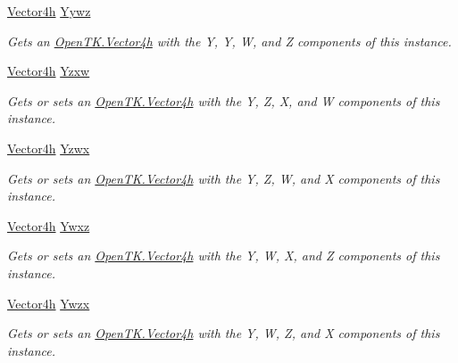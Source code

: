\begin{DoxyCompactItemize}
\hyperlink{struct_open_t_k_1_1_vector4h}{Vector4h} \hyperlink{struct_open_t_k_1_1_vector4h_a8630663753c0ac0662e433e0eca71ad8}{Yywz}
\begin{DoxyCompactList}\small\item\em Gets an \hyperlink{struct_open_t_k_1_1_vector4h}{Open\-T\-K.\-Vector4h} with the Y, Y, W, and Z components of this instance. \end{DoxyCompactList}\item 
\hyperlink{struct_open_t_k_1_1_vector4h}{Vector4h} \hyperlink{struct_open_t_k_1_1_vector4h_aa351dd8bef6a4ebf9305beedcff274ec}{Yzxw}
\begin{DoxyCompactList}\small\item\em Gets or sets an \hyperlink{struct_open_t_k_1_1_vector4h}{Open\-T\-K.\-Vector4h} with the Y, Z, X, and W components of this instance. \end{DoxyCompactList}\item 
\hyperlink{struct_open_t_k_1_1_vector4h}{Vector4h} \hyperlink{struct_open_t_k_1_1_vector4h_a10804c2b72ac7c3586afc810f86e9651}{Yzwx}
\begin{DoxyCompactList}\small\item\em Gets or sets an \hyperlink{struct_open_t_k_1_1_vector4h}{Open\-T\-K.\-Vector4h} with the Y, Z, W, and X components of this instance. \end{DoxyCompactList}\item 
\hyperlink{struct_open_t_k_1_1_vector4h}{Vector4h} \hyperlink{struct_open_t_k_1_1_vector4h_acc038049fcbef772cd8096abdfb3a321}{Ywxz}
\begin{DoxyCompactList}\small\item\em Gets or sets an \hyperlink{struct_open_t_k_1_1_vector4h}{Open\-T\-K.\-Vector4h} with the Y, W, X, and Z components of this instance. \end{DoxyCompactList}\item 
\hyperlink{struct_open_t_k_1_1_vector4h}{Vector4h} \hyperlink{struct_open_t_k_1_1_vector4h_a1f3fcdc99dd4520b3bf63471b2a9cc16}{Ywzx}
\begin{DoxyCompactList}\small\item\em Gets or sets an \hyperlink{struct_open_t_k_1_1_vector4h}{Open\-T\-K.\-Vector4h} with the Y, W, Z, and X components of this instance. \end{DoxyCompactList}\item 

\end{DoxyCompactItemize}
